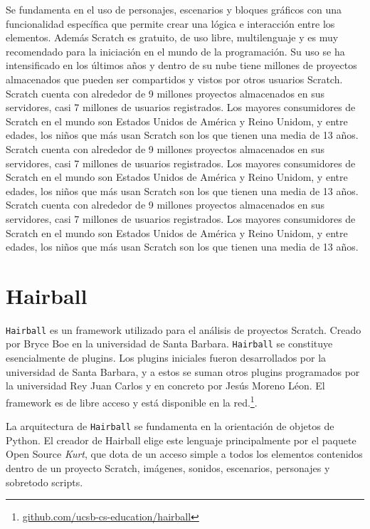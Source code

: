 \documentclass[a4paper, 12pt]{book}
\begin{document}
Se fundamenta en el uso de personajes, escenarios y bloques gráficos con una funcionalidad
específica que permite crear una lógica e interacción entre los elementos. 
Además Scratch es gratuito, de uso libre, multilenguaje y es muy recomendado para la
iniciación en el mundo de la programación. Su uso se ha intensificado en los últimos años 
y dentro de su nube tiene millones de proyectos almacenados que pueden ser compartidos y 
vistos por otros usuarios Scratch. \\

Scratch cuenta con alrededor de 9 millones proyectos almacenados en sus servidores, casi
7 millones de usuarios registrados. Los mayores consumidores de Scratch en el mundo son 
Estados Unidos de América y Reino Unidom, y entre edades, los niños que más usan Scratch
son los que tienen una media de 13 años.  \\

Scratch cuenta con alrededor de 9 millones proyectos almacenados en sus servidores, casi
7 millones de usuarios registrados. Los mayores consumidores de Scratch en el mundo son 
Estados Unidos de América y Reino Unidom, y entre edades, los niños que más usan Scratch
son los que tienen una media de 13 años.  \\

Scratch cuenta con alrededor de 9 millones proyectos almacenados en sus servidores, casi
7 millones de usuarios registrados. Los mayores consumidores de Scratch en el mundo son 
Estados Unidos de América y Reino Unidom, y entre edades, los niños que más usan Scratch
son los que tienen una media de 13 años.  \\


\section{Hairball}
\label{sec:seccion3}
\texttt{Hairball} es un framework utilizado para el análisis de proyectos Scratch. Creado 
por Bryce Boe en la universidad de Santa Barbara. \texttt{Hairball} se constituye esencialmente de 
plugins. Los plugins iniciales fueron desarrollados por la universidad de Santa Barbara, y
a estos se suman otros plugins programados por la universidad Rey Juan Carlos y en concreto
por Jesús Moreno Léon. El framework es de libre acceso y está disponible en la 
red.\footnote{\url{github.com/ucsb-cs-education/hairball}}.

La arquitectura de \texttt{Hairball} se fundamenta en la orientación de objetos de Python. El
creador de Hairball elige este lenguaje principalmente por el paquete Open Source \emph{Kurt}, 
que dota de un acceso simple a todos los elementos contenidos dentro de un proyecto Scratch, 
imágenes, sonidos, escenarios, personajes y sobretodo scripts. 
\end{document}
